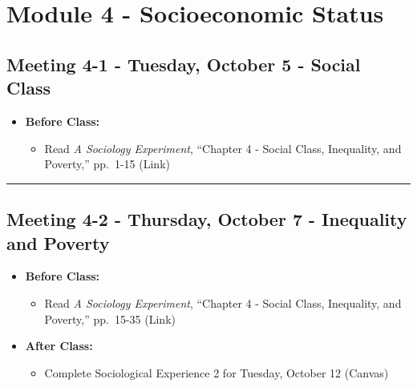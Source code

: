 \documentclass[
]{book}
\providecommand{\tightlist}{%
  \setlength{\itemsep}{0pt}\setlength{\parskip}{0pt}}
\begin{document}
\newpage

\hypertarget{module-4---socioeconomic-status}{%
\section{Module 4 - Socioeconomic Status}\label{module-4---socioeconomic-status}}

\hypertarget{meeting-4-1---tuesday-october-5---social-class}{%
\subsection*{Meeting 4-1 - Tuesday, October 5 - Social Class}\label{meeting-4-1---tuesday-october-5---social-class}}

\begin{itemize}
\tightlist
\item
  \textbf{Before Class:}

  \begin{itemize}
  \tightlist
  \item
    Read \emph{A Sociology Experiment}, ``Chapter 4 - Social Class, Inequality, and Poverty,'' pp.~1-15 (Link)
  \end{itemize}
\end{itemize}

\begin{center}\rule{0.5\linewidth}{0.5pt}\end{center}

\hypertarget{meeting-4-2---thursday-october-7---inequality-and-poverty}{%
\subsection*{Meeting 4-2 - Thursday, October 7 - Inequality and Poverty}\label{meeting-4-2---thursday-october-7---inequality-and-poverty}}

\begin{itemize}
\tightlist
\item
  \textbf{Before Class:}

  \begin{itemize}
  \tightlist
  \item
    Read \emph{A Sociology Experiment}, ``Chapter 4 - Social Class, Inequality, and Poverty,'' pp.~15-35 (Link)
  \end{itemize}
\item
  \textbf{After Class:}

  \begin{itemize}
  \tightlist
  \item
    Complete Sociological Experience 2 for Tuesday, October 12 (Canvas)
  \end{itemize}
\end{itemize}
\end{document}
